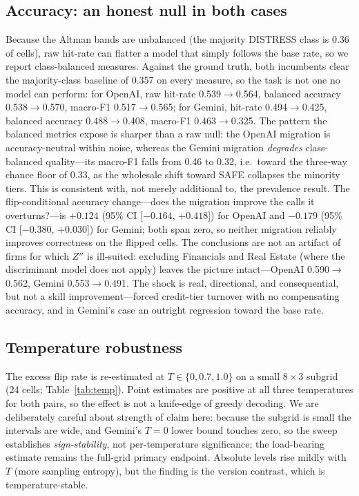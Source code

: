 \documentclass[10pt,twocolumn]{article}
\begin{document}
\subsection{Accuracy: an honest null in both cases}
\label{sec:acc}
Because the Altman bands are unbalanced (the majority DISTRESS class is 0.36 of cells), raw hit-rate can flatter a model that simply follows the base rate, so we report class-balanced measures. Against the ground truth, both incumbents clear the majority-class baseline of 0.357 on every measure, so the task is not one no model can perform: for OpenAI, raw hit-rate 0.539$\to$0.564, balanced accuracy 0.538$\to$0.570, macro-F1 0.517$\to$0.565; for Gemini, hit-rate 0.494$\to$0.425, balanced accuracy 0.488$\to$0.408, macro-F1 0.463$\to$0.325. The pattern the balanced metrics expose is sharper than a raw null: the OpenAI migration is accuracy-neutral within noise, whereas the Gemini migration \emph{degrades} class-balanced quality---its macro-F1 falls from 0.46 to 0.32, i.e.\ toward the three-way chance floor of 0.33, as the wholesale shift toward SAFE collapses the minority tiers. This is consistent with, not merely additional to, the prevalence result. The flip-conditional accuracy change---does the migration improve the calls it overturns?---is $+0.124$ (95\% CI [$-0.164$, $+0.418$]) for OpenAI and $-0.179$ (95\% CI [$-0.380$, $+0.030$]) for Gemini; both span zero, so neither migration reliably improves correctness on the flipped cells. The conclusions are not an artifact of firms for which $Z''$ is ill-suited: excluding Financials and Real Estate (where the discriminant model does not apply) leaves the picture intact---OpenAI 0.590$\to$0.562, Gemini 0.553$\to$0.491. The shock is real, directional, and consequential, but not a skill improvement---forced credit-tier turnover with no compensating accuracy, and in Gemini's case an outright regression toward the base rate.

\subsection{Temperature robustness}
The excess flip rate is re-estimated at $T\in\{0,0.7,1.0\}$ on a small $8\times3$ subgrid (24 cells; Table~\ref{tab:temp}). Point estimates are positive at all three temperatures for both pairs, so the effect is not a knife-edge of greedy decoding. We are deliberately careful about strength of claim here: because the subgrid is small the intervals are wide, and Gemini's $T{=}0$ lower bound touches zero, so the sweep establishes \emph{sign-stability}, not per-temperature significance; the load-bearing estimate remains the full-grid primary endpoint. Absolute levels rise mildly with $T$ (more sampling entropy), but the finding is the version contrast, which is temperature-stable.
\end{document}
